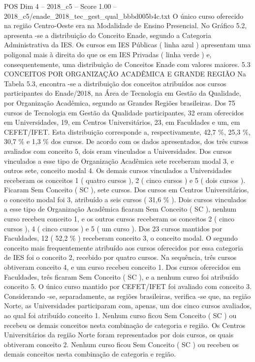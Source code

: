\begin{textsample}{POS Dim 4 – 2018\_c5 – Score 1.00 – 2018\_c5/enade\_2018\_tec\_gest\_qual\_bbbd005b4c.txt}
O único curso oferecido na região Centro-Oeste era na Modalidade de Ensino Presencial.
No Gráfico 5.2, apresenta -se a distribuição do Conceito Enade, segundo a Categoria Administrativa da IES.
Os cursos em IES Públicas ( linha azul ) apresentam uma poligonal mais à direita do que os em IES Privadas ( linha verde ) e, consequentemente, uma distribuição de Conceitos Enade com valores maiores. 5.3 CONCEITOS POR ORGANIZAÇÃO ACADÊMICA E GRANDE REGIÃO Na Tabela 5.3, encontra -se a distribuição dos conceitos atribuídos aos cursos participantes do Enade/2018, na Área de Tecnologia em Gestão da Qualidade, por Organização Acadêmica, segundo as Grandes Regiões brasileiras.
Dos 75 cursos de Tecnologia em Gestão da Qualidade participantes, 32 eram oferecidos em Universidades, 19, em Centros Universitários, 23, em Faculdades e um, em CEFET/IFET.
Esta distribuição corresponde a, respectivamente, 42,7 \%, 25,3 \%, 30,7 \% e 1,3 \% dos cursos.
De acordo com os dados apresentados, dos três cursos avaliados com conceito 5, dois eram vinculados a Universidades.
Dos cursos vinculados a esse tipo de Organização Acadêmica sete receberam modal 3, e outros sete, conceito modal 4.
Os demais cursos vinculados a Universidades receberam os conceitos 1 ( quatro cursos ), 2 ( cinco cursos ) e 5 ( dois cursos ).
Ficaram Sem Conceito ( SC ), sete cursos.
Dos cursos em Centros Universitários, o conceito modal foi 3, atribuído a seis cursos ( 31,6 \% ).
Dois cursos vinculados a esse tipo de Organização Acadêmica ficaram Sem Conceito ( SC ), nenhum curso recebeu conceito 1, e os outros cursos receberam os conceitos 2 ( cinco cursos ), 4 ( cinco cursos ) e 5 ( um curso ).
Dos 23 cursos mantidos por Faculdades, 12 ( 52,2 \% ) receberam conceito 3, o conceito modal.
O segundo conceito mais frequentemente atribuído aos cursos oferecidos por essa categoria de IES foi o conceito 2, recebido por quatro cursos.
Na sequência, três cursos obtiveram conceito 4, e um curso recebeu conceito 1.
Dos cursos oferecidos em Faculdades, três ficaram Sem Conceito ( SC ), e a nenhum curso foi atribuído conceito 5.
O único curso mantido por CEFET/IFET foi avaliado com conceito 3.
Considerando -se, separadamente, as regiões brasileiras, verifica -se que, na região Norte, as Universidades participaram com, apenas, um dos cinco cursos avaliados, ao qual foi atribuído conceito 1.
Nenhum curso ficou Sem Conceito ( SC ) ou recebeu os demais conceitos nesta combinação de categoria e região.
Os Centros Universitários da região Norte foram representados por dois cursos, os quais obtiveram conceito 2.
Nenhum curso ficou Sem Conceito ( SC ) ou recebeu os demais conceitos nesta combinação de categoria e região.

\end{textsample}
